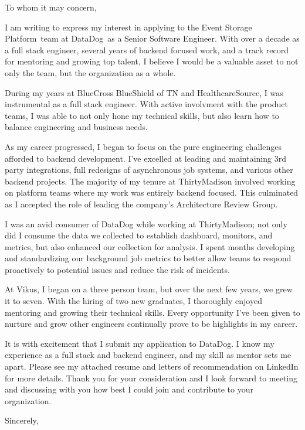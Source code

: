 
\usepackage{parskip}

\newcommand{\applyteam}{Event Storage Platform}
\newcommand{\applycompany}{DataDog}
\newcommand{\applyrole}{Senior Software Engineer}





To whom it may concern,

I am writing to express my interest in applying to the \applyteam\ team at \applycompany\ as a \applyrole.
With over a decade as a full stack engineer, several years of backend focused work, and a track record for
mentoring and growing top talent, I believe I would be a valuable asset to not only the team, but the
organization as a whole.

During my years at BlueCross BlueShield of TN and HealthcareSource, I was instrumental as a full stack
engineer. With active involvment with the product teams, I was able to not only hone my technical skills,
but also learn how to balance engineering and business needs.

As my career progressed, I began to focus on the pure engineering challenges afforded
to backend development. I've excelled at leading and maintaining 3rd party integrations, full redesigns of
asynchronous job systems, and various other backend projects. The majority of my tenure at ThirtyMadison
involved working on platform teams where my work was entirely backend focused. This culminated as I accepted
the role of leading the company's Architecture Review Group.

I was an avid consumer of DataDog while working at ThirtyMadison; not only did I consume the data
we collected to establish dashboard, monitors, and metrics, but also enhanced our collection for analysis.
I spent months developing and standardizing our background job metrics to better allow teams to
respond proactively to potential issues and reduce the risk of incidents.

At Vikus, I began on a three person team, but over the next few years, we grew it to seven. With the hiring 
of two new graduates, I thoroughly enjoyed mentoring and growing their technical skills. Every opportunity
I've been given to nurture and grow other engineers continually prove to be highlights in my career.

It is with excitement that I submit my application to \applycompany. I know my experience as a
full stack and backend engineer, and my skill as mentor sets me apart. Please see my attached resume and
letters of recommendation on LinkedIn for more details. Thank you for your consideration and I look forward
to meeting and discussing with you how best I could join and contribute to your organization.

\hfill \break
Sincerely,\\
\name

